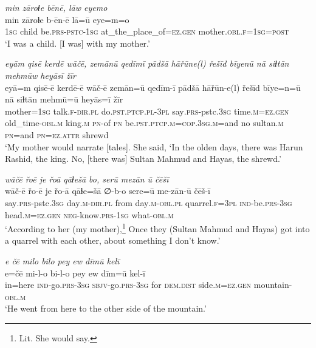 \ea \label{ŽH.1}
\textit{min zāroɫe bēnē, lāw eyemo} \\ 
\gll min zāroɫe b-ēn-ē lā=ū eye=m=o \\ 
 \textsc{1sg} child be\textsc{.prs}\textsc{-pstc}\textsc{-1sg} at\_the\_place\_of\textsc{=ez}\textsc{.gen} mother\textsc{.obl}\textsc{\textsc{.f}}\textsc{=1sg}\textsc{=\textsc{post}} \\ 
\glt `I was a child. [I was] with my mother.'
\z 
 
\ea \label{ŽH.2}
\textit{eyām qisē kerdē wāčē, zemānū qedīmī pādšā hāřūne(l) řešīd bīyenū nā siɫtān mehmūw heyāsī žīr} \\ 
\gll eyā=m qisē-ē kerdē-ē wāč-ē zemān=ū qedīm-ī pādšā hāřūn-e(l) řešīd bīye=n=ū nā siɫtān mehmū=ū heyās=ī žīr \\ 
 mother\textsc{=1sg} talk\textsc{\textsc{.f}}\textsc{-dir}\textsc{.pl} do\textsc{.pst}\textsc{.ptcp}\textsc{.pl}\textsc{-3pl} say\textsc{.prs-}pstc\textsc{.3sg} time\textsc{.m}\textsc{=ez}\textsc{.gen} old\_time\textsc{-obl}\textsc{.m} king\textsc{.m} \textsc{pn}-of \textsc{pn} be\textsc{.pst}\textsc{.ptcp}\textsc{.m}\textsc{=cop}\textsc{.3sg}\textsc{.m}=and no sultan\textsc{.m} \textsc{pn}=and \textsc{pn}\textsc{=ez}.\textsc{attr} shrewd \\ 
\glt `My mother would narrate [tales]. She said, ‘In the olden days, there was Harun Rashid, the king. No, [there was] Sultan Mahmud and Hayas, the shrewd.'
\z 
 
\ea \label{ŽH.3}
\textit{wāčē řoē je řoā qāɫešā bo, serū mezān ū čēšī} \\ 
\gll wāč-ē řo-ē je řo-ā qāɫe=šā ∅-b-o sere=ū me-zān-ū čēš-ī \\ 
 say\textsc{.prs-}pstc\textsc{.3sg} day\textsc{.m}\textsc{-dir}\textsc{.pl} from day\textsc{.m}\textsc{-obl}\textsc{.pl} quarrel\textsc{\textsc{.f}}\textsc{=3pl} \textsc{ind-}be\textsc{.prs}\textsc{-3sg} head\textsc{.m}\textsc{=ez}\textsc{.gen} \textsc{neg-}know\textsc{.prs}\textsc{-1sg} what\textsc{-obl}\textsc{.m} \\ 
\glt `According to her (my mother),\footnote{Lit. She would say.}  Once they (Sultan Mahmud and Hayas) got into a quarrel with each other, about something I don’t know.'
\z 
 
\ea \label{ŽH.5}
\textit{e čē milo bilo pey ew dīmū kelī} \\ 
\gll e=čē mi-l-o bi-l-o pey ew dīm=ū kel-ī \\ 
 in=here \textsc{ind-}go\textsc{.prs}\textsc{-3sg} \textsc{sbjv-}go\textsc{.prs}\textsc{-3sg} for \textsc{dem.dist} side\textsc{.m}\textsc{=ez}\textsc{.gen} mountain\textsc{-obl}\textsc{.m} \\ 
\glt `He went from here to the other side of the mountain.'
\z 
 
